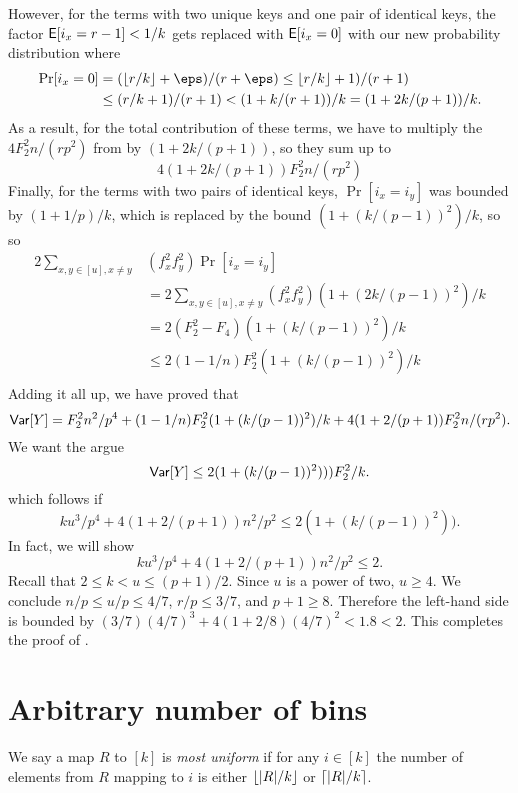 However, for the terms with two unique keys and one pair of identical keys, the
factor $\operatorname*{\sf{E}}[i_x=r-1]<1/k$ gets replaced with $\operatorname*{\sf{E}}[i_x=0]$ with our
new probability distribution where
\begin{align*}
\Pr[i_x=0]&=(\floor{r/k}+\eps)/(r+\eps)\leq \floor{r/k}+1)/(r+1)\\
&\leq (r/k+1)/(r+1)<(1+k/(r+1))/k=(1+2k/(p+1))/k.
\end{align*}
As a result, for the total contribution of these terms, we have to multiply the
$4 F_2^2 n/(rp^2)$ from  by $(1+2k/(p+1))$, so they
sum up to
\begin{equation}\label{eq:one-pair'}
4 (1+2k/(p+1)) F_2^2 n/(rp^2)
\end{equation}
Finally, for the terms with two pairs of identical keys, $\Pr[i_x=i_y]$ was bounded
by $(1+1/p)/k$, which is replaced by the bound $(1+(k/(p-1))^2)/k$, so
so 
\begin{align}
2\sum_{x,y\in[u],x\neq y}&(f_x^2f_y^2)\Pr[i_x=i_y]\nonumber\\
&=2\sum_{x,y\in[u],x\neq y}(f_x^2f_y^2)(1+(2k/(p-1))^2)/k\nonumber\\
&=2(F_2^2-F_4)(1+(k/(p-1))^2)/k\nonumber\\
&\leq 2(1-1/n)F_2^2(1+(k/(p-1))^2)/k\label{eq:two-pairs'}\\
\end{align}
Adding it all up, we have proved that 
\[{\sf Var}[Y]=F_2^2 n^2/p^4+(1-1/n)F_2^2(1+(k/(p-1))^2)/k+4(1+2/(p+1))F_2^2 n/(rp^2).\]
We want the argue
\begin{equation}\label{eq:Var-bound}
{\sf Var}[Y]\leq 2(1+(k/(p-1))^2)))F_2^2/k.
\end{equation}
which follows if 
\[ku^3/p^4+4(1+2/(p+1))n^2/p^2\leq 2(1+(k/(p-1))^2)).\]
In fact, we will show 
\[ku^3/p^4+4(1+2/(p+1))n^2/p^2\leq 2.\]
Recall that $2\leq k<u\leq (p+1)/2$. Since $u$ is a power of two,
$u\geq 4$. We conclude $n/p\leq u/p\leq 4/7$, $r/p\leq 3/7$, and
$p+1\geq 8$. Therefore the left-hand side is bounded by
$(3/7)(4/7)^3+4(1+2/8)(4/7)^2<1.8<2$. This completes the proof of
.   


\section{Arbitrary number of bins}
We say a map $R$ to $[k]$ is \emph{most uniform} if for any
$i\in[k]$ the number of elements from $R$ mapping to $i$ is either
$\lfloor {|R|/k} \rfloor$ or $\lceil {|R|/k}\rceil$. 


